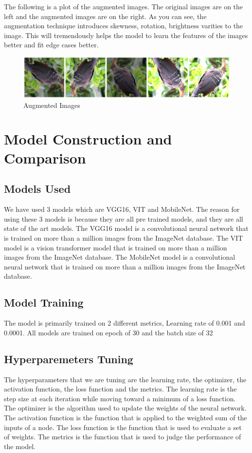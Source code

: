 The following is a plot of the augmented images. The original images are on the left and the augmented images are on the right. As you can see, the augmentation technique introduces skewness, rotation, brightness varities to the image. This will tremendously helps the model to learn the features of the images better and fit edge cases better.

\begin{figure}[h]
\centering
\includegraphics[scale=0.30]{brightness_enhancement.png}
\caption{Augmented Images}
\end{figure}

\pagebreak
\section{Model Construction and Comparison}
\subsection*{Models Used}
We have used 3 models which are VGG16, VIT and MobileNet. The reason for using these 3 models is because they are all pre trained models, and they are all state of the art models. The VGG16 model is a convolutional neural network that is trained on more than a million images from the ImageNet database. The VIT model is a vision transformer model that is trained on more than a million images from the ImageNet database. The MobileNet model is a convolutional neural network that is trained on more than a million images from the ImageNet database.

\subsection*{Model Training}
The model is primarily trained on 2 different metrics, Learning rate of 0.001 and 0.0001. All models are trained on epoch of 30 and the batch size of 32

\subsection*{Hyperparemeters Tuning} 
The hyperparameters that we are tuning are the learning rate, the optimizer, the activation function, the loss function and the metrics. The learning rate is the step size at each iteration while moving toward a minimum of a loss function. The optimizer is the algorithm used to update the weights of the neural network. The activation function is the function that is applied to the weighted sum of the inputs of a node. The loss function is the function that is used to evaluate a set of weights. The metrics is the function that is used to judge the performance of the model.


